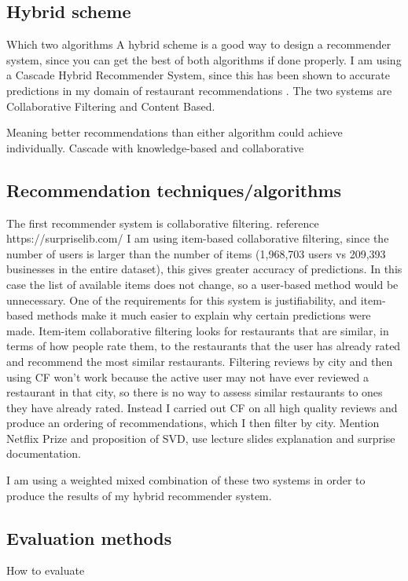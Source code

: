 \documentclass[conference]{IEEEtran}
\begin{document}
\subsection{Hybrid scheme}
Which two algorithms
A hybrid scheme is a good way to design a recommender system, since you can get the
best of both algorithms if done properly. 
I am using a Cascade Hybrid Recommender System, since this has been shown to accurate predictions 
in my domain of restaurant recommendations \cite{burke2007hybrid}. 
The two systems are Collaborative Filtering and Content Based. 

Meaning better recommendations than either algorithm could achieve individually.
Cascade with knowledge-based and collaborative


\subsection{Recommendation techniques/algorithms}
The first recommender system is collaborative filtering. reference https://surpriselib.com/
I am using item-based collaborative filtering, since the number of users is larger than the number of items 
(1,968,703 users vs 209,393 businesses in the entire dataset), this gives greater accuracy of predictions. 
In this case the list of available items does not change, so a user-based method would be unnecessary. 
One of the requirements for this system is justifiability, and item-based methods make it much easier to 
explain why certain predictions were made. 
Item-item collaborative filtering looks for restaurants that are similar, in terms of how people rate them, 
to the restaurants that the user has already rated and recommend the most similar restaurants. 
Filtering reviews by city and then using CF won't work because the active user may not have ever reviewed a restaurant 
in that city, so there is no way to assess similar restaurants to ones they have already rated. 
Instead I carried out CF on all high quality reviews and produce an ordering of recommendations, which I then filter 
by city. 
Mention Netflix Prize and proposition of SVD, use lecture slides explanation and surprise documentation. 

I am using a weighted mixed combination of these two systems in order to produce the results
of my hybrid recommender system.

\subsection{Evaluation methods}
How to evaluate
\end{document}
